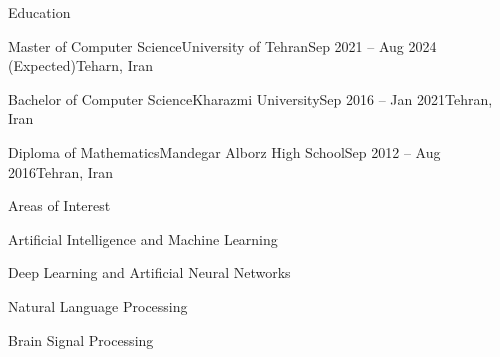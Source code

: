 \documentclass[]{main}
\begin{document}
\resumeheader
{}
{}
{}
{}
{}
{}

\begin{section}{Education}
 \begin{subsectionnobullet}{Master of Computer Science}{University of Tehran}{Sep 2021 -- Aug 2024 (Expected)}{Teharn, Iran}
 \end{subsectionnobullet}

 \begin{subsectionnobullet}{Bachelor of Computer Science}{Kharazmi University}{Sep 2016 -- Jan 2021}{Tehran, Iran}
 \end{subsectionnobullet}

 \begin{subsectionnobullet}{Diploma of Mathematics}{Mandegar Alborz High School}{Sep 2012 -- Aug 2016}{Tehran, Iran}
 \end{subsectionnobullet}
\end{section}

\begin{section}{Areas of Interest}
 \begin{subsectionbullet}
     \item Artificial Intelligence and Machine Learning
     \item Deep Learning and Artificial Neural Networks
     \item Natural Language Processing
     \item Brain Signal Processing
 \end{subsectionbullet}
\end{section}
\end{document}
